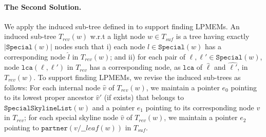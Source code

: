 \documentclass[smallabstract,smallcaptions]{dccpaper}
\def\idtt#1{\ensuremath{\mathtt{#1}}}
\def\hp\_leaf{\idtt{hp\_leaf}}
\def\partner{\idtt{partner}}
\def\SpecialSkylineList{\idtt{SpecialSkylineList}}
\def\Special{\idtt{Special}}
\def\lca{\idtt{lca}}
\begin{document}
\paragraph{The Second Solution.} %
We apply the induced sub-tree defined in \cite[Definition 18]{abedin2018heaviest} to support finding LPMEMs.
An induced sub-tree $T_{rev}(w)$ w.r.t a light node $w\in T_{suf}$ is a tree having exactly $|\Special(w)|$ nodes such that i) each node $l \in \Special(w)$ has a corresponding node $\hat{l}$ in $T_{rev}(w)$; and ii) for each pair of $\ell, \ell' \in \Special(w)$, node $\lca(\ell, \ell')$ in $T_{rev}$ has a corresponding node, as $\lca$ of $\hat{\ell}$ and $\hat{\ell'}$, in $T_{rev}(w)$.
To support finding LPMEMs, we revise the induced sub-trees as follows:
For each internal node $\hat{v}$ of $T_{rev}(w)$, we maintain a pointer $e_0$ pointing to its lowest proper ancestor $\hat{v}'$ (if exists) that belongs to $\SpecialSkylineList(w)$ and a pointer $e_1$ pointing to its corresponding node $v$ in $T_{rev}$;
for each special skyline node $\hat{v}$ of $T_{rev}(w)$, we maintain a pointer $e_2$ pointing to $\partner(v/\hp\_leaf(w))$ in $T_{suf}$.
\end{document}
